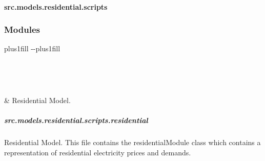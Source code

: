 \documentclass[letterpaper,10pt,english]{sphinxmanual}
\begin{document}
\sphinxstepscope


\paragraph{src.models.residential.scripts}
\label{\detokenize{src.models.residential.scripts:module-src.models.residential.scripts}}\label{\detokenize{src.models.residential.scripts:src-models-residential-scripts}}\label{\detokenize{src.models.residential.scripts::doc}}\subsubsection*{Modules}


\begin{savenotes}
\sphinxatlongtablestart
\sphinxthistablewithglobalstyle
\sphinxthistablewithnovlinesstyle
\makeatletter
  \LTleft \@totalleftmargin plus1fill
  \LTright\dimexpr\columnwidth-\@totalleftmargin-\linewidth\relax plus1fill
\makeatother
\begin{longtable}{}
\sphinxtoprule
\endfirsthead

\\
\sphinxtoprule
\endhead

\sphinxbottomrule
{}\\
\endfoot

\endlastfoot
\sphinxtableatstartofbodyhook

\sphinxAtStartPar
{\hyperref[\detokenize{src.models.residential.scripts.residential:module-src.models.residential.scripts.residential}]{}}
&
\sphinxAtStartPar
Residential Model.
\\
\sphinxbottomrule
\end{longtable}
\sphinxtableafterendhook
\sphinxatlongtableend
\end{savenotes}

\sphinxstepscope


\subparagraph{src.models.residential.scripts.residential}
\label{\detokenize{src.models.residential.scripts.residential:module-src.models.residential.scripts.residential}}\label{\detokenize{src.models.residential.scripts.residential:src-models-residential-scripts-residential}}\label{\detokenize{src.models.residential.scripts.residential::doc}}
\sphinxAtStartPar
Residential Model.
This file contains the residentialModule class which contains a representation of residential
electricity prices and demands.
\end{document}
